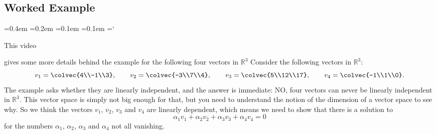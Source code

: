 
\subsection*{Worked Example}

{\ttfamily
{}\font=0.4em
\font=0.2em
\font=0.1em
\font=0.1em
\hyphenchar\font=`\-


\hypertarget{linear_independence_example}{This video} gives some more details behind the example for the following four vectors in ${\mathbb R}^3$
Consider the following vectors in \(\mathbb{R}^3\):
\[
v_1=\colvec{4\\-1\\3}, \qquad
v_2=\colvec{-3\\7\\4}, \qquad
v_3=\colvec{5\\12\\17}, \qquad
v_4=\colvec{-1\\1\\0}.
\]
The example asks whether they are linearly independent, and the answer is immediate: NO, four vectors can never be linearly independent in ${\mathbb R}^3$. This vector space is simply not big enough for that, but you need to understand the notion of the dimension of a vector space to see why.
So we think the vectors $v_1$, $v_2$, $v_3$ and $v_4$ are linearly dependent, which means we need to show that there is a solution to 
\[
\alpha_1 v_1 + \alpha_2 v_2 + \alpha_3 v_3 + \alpha_4 v_4 = 0
\]
for the numbers $\alpha_1$, $\alpha_2$, $\alpha_3$ and $\alpha_4$  not all vanishing. 

}
